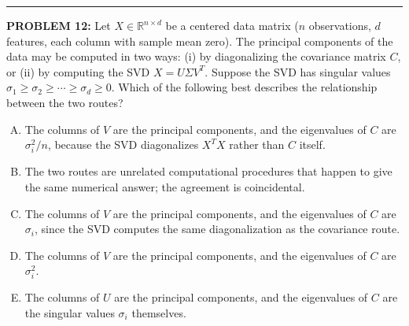 \documentclass[12pt]{amsart}
\newcommand{\divider}{
  \vspace{-1em} %
  \noindent
  \raisebox{-0.15ex}{\textbullet}%
  \hspace{0.5em}%
  \rule[0.5ex]{0.95\textwidth}{1.0pt}%
  \hspace{0.5em}%
  \raisebox{-0.15ex}{\textbullet}%
  \vspace{0em} %
}
\begin{document}
%
\divider

{\bf PROBLEM 12:}
%
Let $X \in \mathbb{R}^{n \times d}$ be a centered data matrix ($n$
observations, $d$ features, each column with sample mean zero). The
principal components of the data may be computed in two ways: (i) by
diagonalizing the covariance matrix $C$, or (ii) by
computing the SVD $X = U\Sigma V^T$. Suppose the SVD has singular values
$\sigma_1 \geq \sigma_2 \geq \cdots \geq \sigma_d \geq 0$. Which of the
following best describes the relationship between the two routes?

\begin{enumerate}[(A)]
\item The columns of $V$ are the principal components, and the eigenvalues of $C$ are $\sigma_i^2 / n$, because the SVD diagonalizes $X^T X$ rather than $C$ itself.
\item The two routes are unrelated computational procedures that happen to give the same numerical answer; the agreement is coincidental.
\item The columns of $V$ are the principal components, and the eigenvalues of $C$ are $\sigma_i$, since the SVD computes the same diagonalization as the covariance route.
\item The columns of $V$ are the principal components, and the eigenvalues of $C$ are $\sigma_i^2$.
\item The columns of $U$ are the principal components, and the eigenvalues of $C$ are the singular values $\sigma_i$ themselves.
\end{enumerate}
\end{document}
